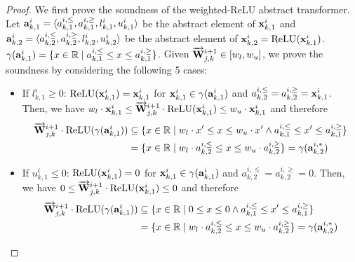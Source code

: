 \begin{proof}

We first prove the soundness of the weighted-ReLU abstract transformer. Let ${\mathbf{a}}^{i}_{k,1}=\langle a^{i,\le}_{k,1},a^{i,\ge}_{k,1},l^{i}_{k,1},u^{i}_{k,1} \rangle$ be the abstract element of ${\mathbf{x}}^i_{k,1}$ and ${\mathbf{a}}^{i}_{k,2}=\langle a^{i,\le}_{k,2},a^{i,\ge}_{k,2},l^{i}_{k,2},u^{i}_{k,2} \rangle$ be the abstract element of ${\mathbf{x}}^i_{k,2}=\text{ReLU}({\mathbf{x}}^i_{k,1})$. 
$\gamma({\mathbf{a}}^i_{k,1}) = \{ x\in\mathbb{R}\mid a^{i,\le}_{k,1}\le x \le a^{i,\ge}_{k,1}\}$.         
Given $\overrightarrow{{\mathbf{W}}}^{i+1}_{j,k}\in[w_l,w_u]$, we prove the soundness by considering the following 5 cases:
\begin{itemize}
        \item If $l^i_{k,1}\ge 0$: $\text{ReLU}({\mathbf{x}}^i_{k,1})={\mathbf{x}}^i_{k,1}$ for ${\mathbf{x}}^i_{k,1}\in\gamma({\mathbf{a}}^i_{k,1})$ and $a^{i,\le}_{k,2}=a^{i,\ge}_{k,2}={\mathbf{x}}^{i}_{k,1}$. Then, we have $w_l \cdot {\mathbf{x}}^i_{k,1}\le \overrightarrow{{\mathbf{W}}}^{i+1}_{j,k}\cdot \text{ReLU}({\mathbf{x}}^i_{k,1})\le w_u\cdot {\mathbf{x}}^{i}_{k,1}$ and therefore
        \begin{displaymath}
        \begin{aligned}
            \overrightarrow{{\mathbf{W}}}^{i+1}_{j,k}\cdot \text{ReLU}(\gamma({\mathbf{a}}^i_{k,1})) & \subseteq \{ x\in\mathbb{R} \mid w_l \cdot x' \le x \le w_u \cdot x' \wedge a^{i,\le}_{k,1} \le x'\le a^{i,\ge}_{k,1}\} \\
            & = \{ x\in\mathbb{R} \mid w_l \cdot a^{i,\le}_{k,2} \le x \le w_u\cdot a^{i,\ge}_{k,2}\} = \gamma({\mathbf{a}}^{i,*}_{k,2})
        \end{aligned}
        \end{displaymath}
        
        \item If $u^i_{k,1}\le 0$: $\text{ReLU}({\mathbf{x}}^i_{k,1})=0$ for ${\mathbf{x}}^i_{k,1}\in\gamma({\mathbf{a}}^i_{k,1})$ and $a^{i,\le}_{k,2}=a^{i,\ge}_{k,2}=0$. Then, we have $0 \le \overrightarrow{{\mathbf{W}}}^{i+1}_{j,k}\cdot \text{ReLU}({\mathbf{x}}^i_{k,1})\le 0$ and therefore 
        \begin{displaymath}
        \begin{aligned}
            \overrightarrow{{\mathbf{W}}}^{i+1}_{j,k}\cdot \text{ReLU}(\gamma({\mathbf{a}}^i_{k,1})) & \subseteq \{ x\in\mathbb{R} \mid 0 \le x \le 0 \wedge a^{i,\le}_{k,1} \le x'\le a^{i,\ge}_{k,1}\} \\
            & = \{ x\in\mathbb{R} \mid w_l \cdot a^{i,\le}_{k,2} \le x \le w_u\cdot a^{i,\ge}_{k,2}\} = \gamma({\mathbf{a}}^{i,*}_{k,2})
        \end{aligned}
        \end{displaymath}
        

\end{itemize}
\end{proof}
